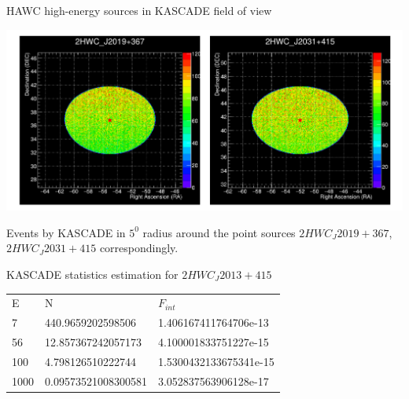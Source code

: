\begin{frame}{HAWC high-energy sources in KASCADE field of view}
 \begin{center}
    \includegraphics[width=1\textwidth]{pics/2HWCsources.pdf}
    
 Events by KASCADE in $5^0$ radius around the point sources $2HWC_J2019+367$, $2HWC_J2031+415$ correspondingly.

\end{center}
\end{frame}


\begin{frame}{KASCADE statistics estimation for $2HWC_J2013+415$}

\begin{table}[]
\begin{tabular}{lll}
E &       N &      $F_{int}$  \\
7 & 440.9659202598506 & 1.406167411764706e-13\\
56 & 12.857367242057173 & 4.100001833751227e-15\\
100 & 4.798126510222744 & 1.5300432133675341e-15\\
1000 & 0.09573521008300581 & 3.052837563906128e-17\\
\end{tabular}
\end{table}

\end{frame}
